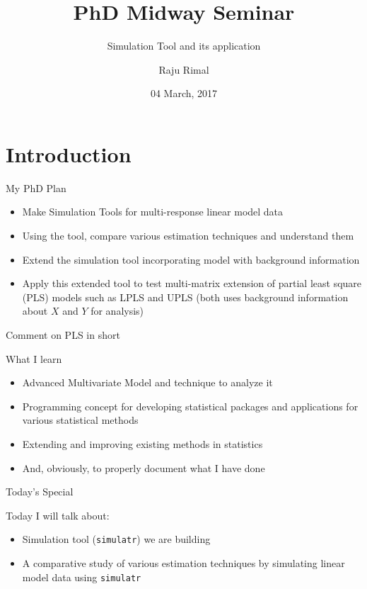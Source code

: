 \documentclass[ignorenonframetext,]{beamer}
\title{PhD Midway Seminar}
\subtitle{Simulation Tool and its application}
\author{Raju Rimal}
\institute{\textbf{Supervisors}\\
Solve Sæbø, Tryge Almøy}
\date{04 March, 2017}
\providecommand{\tightlist}{%
\setlength{\itemsep}{0pt}\setlength{\parskip}{0pt}}
\begin{document}
\frame{\titlepage}

\section{Introduction}\label{introduction}

\begin{frame}{My PhD Plan}

\hypertarget{left}{}

\hypertarget{right}{}
\begin{itemize}[<+->]
\tightlist
\item
  Make {Simulation Tools} for multi-response linear model data
\item
  Using the tool, compare various {estimation techniques} and
  {understand} them
\item
  {Extend} the simulation tool incorporating model with {background
  information}
\item
  Apply this extended tool to {test multi-matrix extension of partial
  least square (PLS)} models such as LPLS and UPLS (both uses background
  information about \(X\) and \(Y\) for analysis)
\end{itemize}

\begin{block}{Comment on PLS in short}

\end{block}

\end{frame}

\begin{frame}{What I learn}

\begin{itemize}[<+->]
\tightlist
\item
  Advanced Multivariate Model and technique to analyze it
\item
  Programming concept for developing statistical packages and
  applications for various statistical methods
\item
  Extending and improving existing methods in statistics
\item
  And, obviously, to properly document what I have done
\end{itemize}

\end{frame}

\begin{frame}[fragile]{Today's Special}

Today I will talk about:

\begin{itemize}[<+->]
\tightlist
\item
  Simulation tool ({\texttt{simulatr}}) we are building
\item
  A {comparative study} of various estimation techniques by simulating
  linear model data using \texttt{simulatr}
\end{itemize}

\end{frame}
\end{document}
